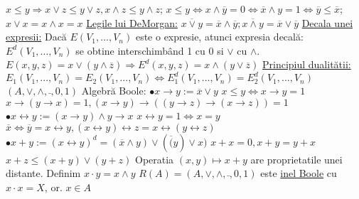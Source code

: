 \documentclass[8pt,twocolumn]{extarticle}
\begin{document}
	$x \leq y \Rightarrow x \vee z \leq y \vee z, x \wedge z \leq y \wedge z$; $x \leq y \Leftrightarrow x \wedge \overline{y} = 0 \Leftrightarrow \overline{x} \wedge y = 1 \Leftrightarrow \overline{y} \leq \overline{x}$; \newline
	$x \vee x = x \wedge x = x$ \newline
	\noindent \underline{Legile lui DeMorgan:} $\overline{x \vee y} = \overline{x} \wedge \overline{y}; \overline{x \wedge y} = \overline{x} \vee \overline{y}$ \newline
	\underline{Decala unei expresii:} Dacă $E(V_{1}, ..., V_{n})$ este o expresie, atunci expresia decală: $E^{d}(V_{1}, ..., V_{n})$ se obtine interschimbând 1 cu 0 si $\vee$ cu $\wedge$. $E(x, y, z) = x \vee (y \wedge \overline{z}) \Rightarrow E^{d}(x, y, z) = x \wedge (y \vee \overline{z})$ \newline
	\underline{Principiul dualitătii:} $E_{1}(V_{1}, ..., V_{n}) = E_{2}(V_{1}, ..., V_{n}) \Leftrightarrow E^{d}_{1}(V_{1}, ..., V_{n}) = E^{d}_{2}(V_{1}, ..., V_{n})$ \newline
	$(A, \vee, \wedge, \bar{ }, 0, 1)$ Algebră Boole: \newline
	$\bullet x \rightarrow y := \overline{x} \vee y$ \newline
	$x \leq y \Leftrightarrow x \rightarrow y = 1$ \newline
	$x \rightarrow (y \rightarrow x) = 1, (x \rightarrow y) \rightarrow ((y \rightarrow z) \rightarrow (x \rightarrow z)) = 1$ \newline
	$\bullet x \leftrightarrow y := (x \rightarrow y) \wedge y \rightarrow x$ \newline
	$x \leftrightarrow y = 1 \Leftrightarrow x = y$ \newline
	$\overline{x} \Leftrightarrow \overline{y} = x \leftrightarrow y, (x \leftrightarrow y) \leftrightarrow z = x \leftrightarrow (y \leftrightarrow z)$ \newline
	$\bullet x + y := (x \leftrightarrow y)^{d} = (\overline{x} \wedge y) \vee (\overline(y) \vee x)$ \newline
	$x + x = 0, x + y = y + x$ \newline
	$x + z \leq (x+ y) \vee (y + z)$ \newline
	Operatia $(x, y) \mapsto x + y$ are proprietatile unei distante. \newline
	Definim $x \cdot y = x \wedge y$ \newline
	$R(A) = (A, \vee, \wedge, \bar{ }, 0, 1)$ este \underline{inel Boole} cu $x \cdot x = X$, or. $x \in A$ \newline
\end{document}
